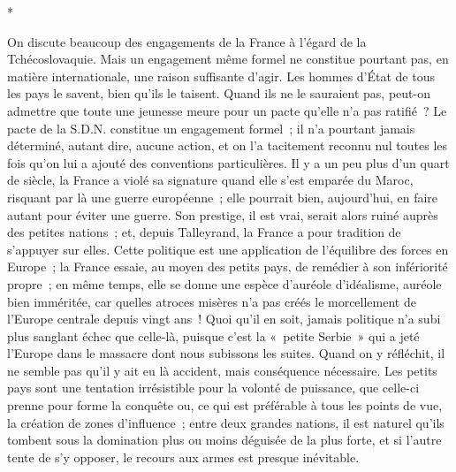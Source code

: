\documentclass[french,twoside]{book} %
\begin{document}
\begin{center}
*\end{center}
\noindent On discute beaucoup des engagements de la France à l'égard de la Tchécoslovaquie. Mais un engagement même formel ne constitue pourtant pas, en matière internationale, une raison suffisante d'agir. Les hommes d'État de tous les pays le savent, bien qu'ils le taisent. Quand ils ne le sauraient pas, peut-on admettre que toute une jeunesse meure pour un pacte qu'elle n'a pas ratifié ? Le pacte de la S.D.N. constitue un engagement formel ; il n'a pourtant jamais déterminé, autant dire, aucune action, et on l'a tacitement reconnu nul toutes les fois qu'on lui a ajouté des conventions particulières. Il y a un peu plus d'un quart de siècle, la France a violé sa signature quand elle s'est emparée du Maroc, risquant par là une guerre européenne ; elle pourrait bien, aujourd'hui, en faire autant pour éviter une guerre. Son prestige, il est vrai, serait alors ruiné auprès des petites nations ; et, depuis Talleyrand, la France a pour tradition de s'appuyer sur elles. Cette politique est une application de l'équilibre des forces en Europe ; la France essaie, au moyen des petits pays, de remédier à son infériorité propre ; en même temps, elle se donne une espèce d'auréole d'idéalisme, auréole bien imméritée, car quelles atroces misères n'a pas créés le morcellement de l'Europe centrale depuis vingt ans ! Quoi qu'il en soit, jamais politique n'a subi plus sanglant échec que celle-là, puisque c'est la « petite Serbie » qui a jeté l'Europe dans le massacre dont nous subissons les suites. Quand on y réfléchit, il ne semble pas qu'il y ait eu là accident, mais conséquence nécessaire. Les petits pays sont une tentation irrésistible pour la volonté de puissance, que celle-ci prenne pour forme la conquête ou, ce qui est préférable à tous les points de vue, la création de zones d'influence ; entre deux grandes nations, il est naturel qu'ils tombent sous la domination plus ou moins déguisée de la plus forte, et si l'autre tente de s'y opposer, le recours aux armes est presque inévitable.\par
\end{document}
